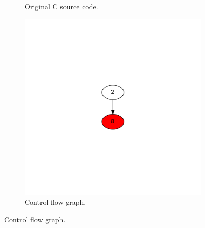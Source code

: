 \begin{figure}[htbp]
	\centering
	\begin{subfigure}[b]{0.48\textwidth}
		\centering
		
		\caption{Original C source code.}
	\end{subfigure}
	\begin{subfigure}[b]{0.50\textwidth}
		\centering
		\includegraphics[width=\textwidth]{inc/appendices/examples/hammock/example/without-break/main_0003b.png}
		\caption{Control flow graph.}
	\end{subfigure}
\end{figure}

